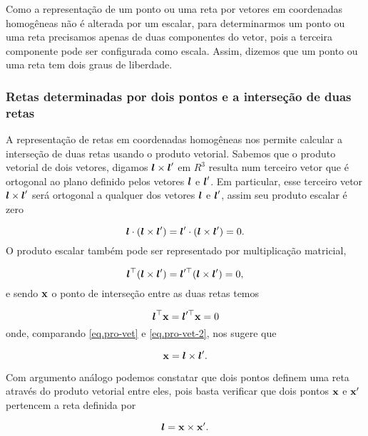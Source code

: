 Como a representação de um ponto ou uma reta por vetores em coordenadas homogêneas não é alterada por um escalar,  para determinarmos um ponto ou uma reta precisamos apenas de duas componentes do vetor, pois a terceira componente pode ser configurada como escala. Assim, dizemos que um ponto ou uma reta tem dois graus de liberdade.
\\

\subsubsection*{Retas determinadas por dois pontos e a interseção de duas retas}

A representação de retas em coordenadas homogêneas nos permite calcular a interseção de duas retas usando o produto vetorial. Sabemos que o produto vetorial de dois vetores, digamos $\boldsymbol{l}\times\boldsymbol{l}'$ em $R^3$ resulta num terceiro vetor que é ortogonal ao plano definido pelos vetores $\boldsymbol{l}$ e $\boldsymbol{l}'$. Em particular, esse terceiro vetor $\boldsymbol{l}\times\boldsymbol{l}'$ será ortogonal a qualquer dos vetores $\boldsymbol{l}$ e $\boldsymbol{l}'$, assim seu produto escalar é zero

\begin{equation*}
\boldsymbol{l}\cdot(\boldsymbol{l}\times\boldsymbol{l}')=\boldsymbol{l}'\cdot(\boldsymbol{l}\times\boldsymbol{l}')=0.
\end{equation*}
O produto escalar também pode ser representado por multiplicação matricial,

\begin{equation}\label{eq.pro-vet}
\boldsymbol{l}^\top(\boldsymbol{l}\times\boldsymbol{l}')=\boldsymbol{l}'^\top(\boldsymbol{l}\times\boldsymbol{l}')=0,
\end{equation}
e sendo $\mathbf{x}$ o ponto de interseção entre as duas retas temos

\begin{equation}\label{eq.pro-vet-2}
\boldsymbol{l}^\top\mathbf{x}=\boldsymbol{l}'^\top\mathbf{x}=0
\end{equation}
onde, comparando \ref{eq.pro-vet} e \ref{eq.pro-vet-2}, nos sugere que

\begin{equation*}
\mathbf{x}=\boldsymbol{l}\times\boldsymbol{l}'.
\end{equation*}


Com argumento análogo podemos constatar que dois pontos definem uma reta através do produto vetorial entre eles, pois basta verificar que dois pontos $\mathbf{x}$ e $\mathbf{x}'$ pertencem a reta definida por

\begin{equation*}
\boldsymbol{l}=\mathbf{x}\times\mathbf{x}'.
\end{equation*}\\


